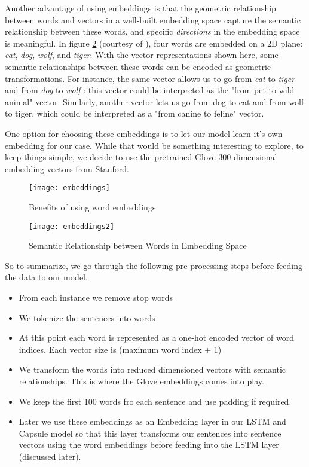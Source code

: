 \documentclass[11pt,twocolumn,letterpaper]{article}
\begin{document}
Another advantage of using embeddings is that the geometric relationship between words and vectors in a well-built  embedding space capture the semantic relationship between these words, and specific \textit{directions} in the embedding space is meaningful. In figure \ref{fig:embeddings2} (courtesy of \cite{dl1}), four words are embedded on a 2D plane: \textit{cat}, \textit{dog}, \textit{wolf}, and \textit{tiger}. With the vector representations shown here, some semantic relationships between these words can be encoded as geometric transformations. For instance, the same vector allows us to go from \textit{cat} to \textit{tiger} and from \textit{dog} to \textit{wolf} : this vector could be interpreted as the "from pet to wild animal" vector. Similarly, another vector lets us go from dog to cat and from wolf to tiger, which could be interpreted as a "from canine to feline" vector.

One option for choosing these embeddings is to let our model learn it's own embedding for our case. While that would be something interesting to explore, to keep things simple, we decide to use the pretrained Glove \cite{glove} 300-dimensional embedding vectors from Stanford. 

\begin{figure}[h]
\texttt{[image: embeddings]}
\caption{Benefits of using word embeddings}
\label{fig:embeddings}
\centering
\end{figure}

\begin{figure}[h]
\texttt{[image: embeddings2]}
\caption{Semantic Relationship between Words in Embedding Space}
\label{fig:embeddings2}
\centering
\end{figure}

So to summarize, we go through the following pre-processing steps before feeding the data to our model.
\begin{itemize}
  \item From each instance we remove stop words
  \item We tokenize the sentences into words
  \item At this point each word is represented as a one-hot encoded vector of word indices. Each vector size is (maximum word index + 1)
  \item We transform the words into reduced dimensioned vectors with semantic relationships.  This is where the Glove embeddings comes into play.
  \item We keep the first 100 words fro each sentence and use padding if required.
  \item Later we use these embeddings as an Embedding layer in our LSTM and Capsule model so that this layer transforms our sentences into sentence vectors using the word embeddings before feeding into the LSTM layer (discussed later).
\end{itemize}
\end{document}
